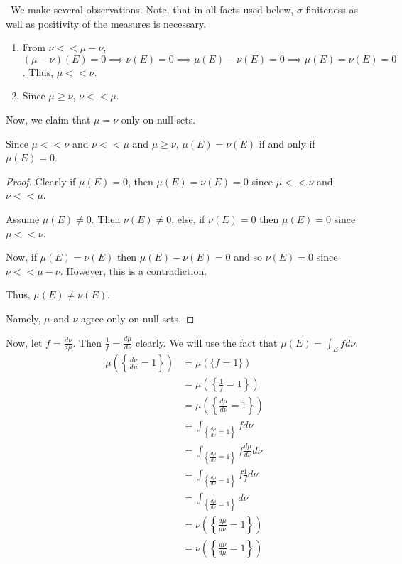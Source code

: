 \documentclass[12pt]{Homework}
\begin{document}
\begin{solution}$\,$
We make several observations. Note, that in all facts used below, $\sigma$-finiteness as well as positivity of the measures is necessary. 
\begin{enumerate}
    \item From $\nu<<\mu-\nu$, $\displaystyle(\mu-\nu)(E)=0\implies\nu(E)=0\implies  \mu(E)-\nu(E)=0\implies \mu(E)=\nu(E)=0$. Thus, $\mu<<\nu$.
    \item Since $\mu\ge\nu$, $\nu<<\mu$.
\end{enumerate}
Now, we claim that $\mu=\nu$ only on null sets.

\begin{claim} Since $\mu<<\nu$ and $\nu<<\mu$ and $\mu\ge\nu$, $\mu(E)=\nu(E)$ if and only if $\mu(E)=0$.
\begin{proof} \boxed{\impliedby} Clearly if $\mu(E)=0$, then $\mu(E)=\nu(E)=0$ since $\mu<<\nu$ and $\nu<<\mu$.

\boxed{\implies} Assume $\mu(E)\not=0$. Then $\nu(E)\not=0$, else, if $\nu(E)=0$ then $\mu(E)=0$ since $\mu<<\nu$.

Now, if $\mu(E)=\nu(E)$ then $\mu(E)-\nu(E)=0$ and so $\nu(E)=0$ since $\nu<<\mu-\nu$. However, this is a contradiction. 

Thus, $\mu(E)\not=\nu(E)$.

Namely, $\mu$ and $\nu$ agree only on null sets.
\end{proof}
\end{claim}

Now, let $f=\frac{d\nu}{d\mu}$. Then $\frac{1}{f}=\frac{d\mu}{d\nu}$ clearly. We will use the fact that $\displaystyle\mu(E)=\int_Efd\nu$. \begin{align*}
    \mu\left(\left\{\frac{d\nu}{d\mu}=1\right\}\right)&=\mu\left(\{f=1\}\right)\\
    &=\mu\left(\left\{\frac{1}{f}=1\right\}\right)\\
    &=\mu\left(\left\{\frac{d\mu}{d\nu}=1\right\}\right)\\
    &=\int_{\left\{\frac{d\mu}{d\nu}=1\right\}}fd\nu\\
    &=\int_{\left\{\frac{d\mu}{d\nu}=1\right\}}f\frac{d\mu}{d\nu}d\nu\\
    &=\int_{\left\{\frac{d\mu}{d\nu}=1\right\}}f\frac{1}{f}d\nu\\
    &=\int_{\left\{\frac{d\mu}{d\nu}=1\right\}}d\nu\\
    &=\nu\left(\left\{\frac{d\mu}{d\nu}=1\right\}\right)\\
    &=\nu\left(\left\{\frac{d\nu}{d\mu}=1\right\}\right)
\end{align*}


\end{solution}
\end{document}
